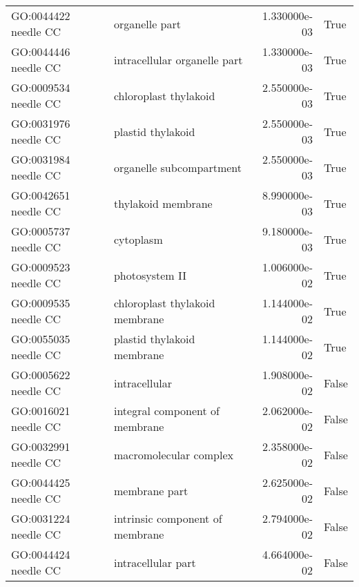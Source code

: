 \begin{tabular}{llrl}
GO:0044422 needle CC       &  organelle part &  1.330000e-03 &  True \\
GO:0044446 needle CC       &  intracellular organelle part &  1.330000e-03 &  True \\
GO:0009534 needle CC       &  chloroplast thylakoid &  2.550000e-03 &  True \\
GO:0031976 needle CC       &  plastid thylakoid &  2.550000e-03 &  True \\
GO:0031984 needle CC       &  organelle subcompartment &  2.550000e-03 &  True \\
GO:0042651 needle CC       &  thylakoid membrane &  8.990000e-03 &  True \\
GO:0005737 needle CC       &  cytoplasm &  9.180000e-03 &  True \\
GO:0009523 needle CC       &  photosystem II &  1.006000e-02 &  True \\
GO:0009535 needle CC       &  chloroplast thylakoid membrane &  1.144000e-02 &  True \\
GO:0055035 needle CC       &  plastid thylakoid membrane &  1.144000e-02 &  True \\
GO:0005622 needle CC       &  intracellular &  1.908000e-02 &  False \\
GO:0016021 needle CC       &  integral component of membrane &  2.062000e-02 &  False \\
GO:0032991 needle CC       &  macromolecular complex &  2.358000e-02 &  False \\
GO:0044425 needle CC       &  membrane part &  2.625000e-02 &  False \\
GO:0031224 needle CC       &  intrinsic component of membrane &  2.794000e-02 &  False \\
GO:0044424 needle CC       &  intracellular part &  4.664000e-02 &  False \\
\bottomrule
\end{tabular}
